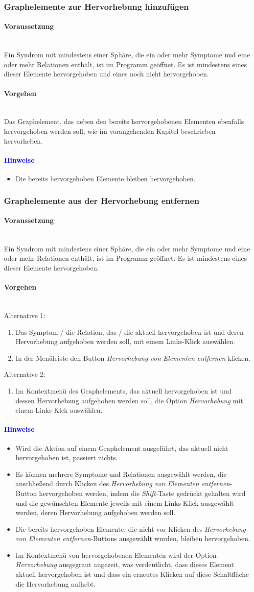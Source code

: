 \documentclass[enabledeprecatedfontcommands,fontsize=11pt,paper=a4,twoside]{scrartcl}
\newcounter{one}
\newcommand*{\hint}{\paragraph{\textcolor{blue}{Hinweise}}}
\newcommand*{\condition}{\paragraph{Voraussetzung}$\;$ \vspace{0.2cm}\\}
\newcommand*{\actions}{\paragraph{Vorgehen} $\;$\vspace{0.2cm}\\}
\begin{document}
		\subsubsection{Graphelemente zur Hervorhebung hinzufügen}
				\condition 	
		Ein Syndrom mit mindestens einer Sphäre, die ein oder mehr Symptome und eine oder mehr Relationen enthält, ist im Programm geöffnet. Es ist mindestens eines dieser Elemente hervorgehoben und eines noch nicht hervorgehoben.
		\actions
		Das Graphelement, das neben den bereits hervorgehobenen Elementen ebenfalls hervorgehoben werden soll, wie im vorangehenden Kapitel beschrieben hervorheben.
		\hint
		\begin{itemize}
					\item Die bereits hervorgehoben Elemente bleiben hervorgehoben.
		\end{itemize}
		\subsubsection{Graphelemente aus der Hervorhebung entfernen}
			\condition 	
		Ein Syndrom mit mindestens einer Sphäre, die ein oder mehr Symptome und eine oder mehr Relationen enthält, ist im Programm geöffnet. Es ist mindestens eines dieser Elemente hervorgehoben.
		\actions
		Alternative 1:
		\begin{enumerate}
			\item Das Symptom / die Relation, das / die aktuell hervorgehoben ist und deren Hervorhebung aufgehoben werden soll, mit einem Links-Klick auswählen. 
			\item In der Menüleiste den Button \textit{Hervorhebung von Elementen entfernen} klicken.
		\end{enumerate}
				Alternative 2:
		\begin{enumerate}
			\item Im Kontextmenü des Graphelements, das aktuell hervorgehoben ist und dessen Hervorhebung aufgehoben werden soll, die Option \textit{Hervorhebung} mit einem Links-Klck auswählen.
		\end{enumerate}
		\hint
		\begin{itemize}
				\item Wird die Aktion auf einem Graphelement ausgeführt, das aktuell nicht hervorgehoben ist, passiert nichts.
					\item Es können mehrere Symptome und Relationen ausgewählt werden, die anschließend durch Klicken des \textit{Hervorhebung von Elementen entfernen}-Button hervorgehoben werden, indem die \textit{Shift}-Taste gedrückt gehalten wird und die gewünschten Elemente jeweils mit einem Links-Klick ausgewählt werden, deren Hervorhebung aufgehoben werden soll.
					\item Die bereits hervorgehoben Elemente, die nicht vor Klicken des \textit{Hervorhebung von Elementen entfernen}-Buttons ausgewählt wurden, bleiben hervorgehoben.
					\item Im Kontextmenü von hervorgehobenen Elementen wird der Option \textit{Hervorhebung}  ausgegraut angezeit, was verdeutlicht, dass dieses Element aktuell hervorgehoben ist und dass ein erneutes Klicken auf diese Schaltfläche die Hervorhebung aufhebt.
		\end{itemize}
\end{document}
